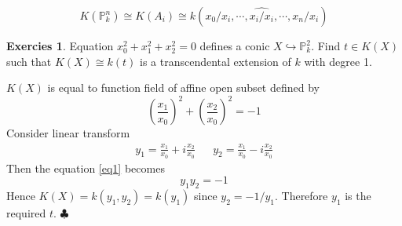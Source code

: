\documentclass[12pt,a4paper]{article}
\theoremstyle{definition}
\newtheorem{exer}{Exercies}[section]
\newcommand*{\qeds}{\hfill\ensuremath{\clubsuit}}
\begin{document}
\[
K(\mathbb{P}^n_k) \cong K(A_i) \cong k(x_0/x_i, \cdots, \widehat{x_i/x_i},\cdots, x_n/x_i)
\]
\begin{exer}
	Equation $x_0^2 + x_1^2 + x_2^2=0$ defines a conic $X \hookrightarrow \mathbb{P}_k^2$. Find $t \in K(X)$ such that $K(X) \cong k(t)$ is a transcendental extension of $k$ with degree 1.
\end{exer}
$K(X)$ is equal to function field of affine open subset defined by
\begin{equation}
\label{eq1}
	(\frac{x_1}{x_0})^2 + (\frac{x_2}{x_0})^2 = -1
\end{equation}
Consider linear transform
\begin{align}
y_1 = \frac{x_1}{x_0} + i \frac{x_2}{x_0}& &
y_2 = \frac{x_1}{x_0} - i \frac{x_2}{x_0}
\end{align}
Then the equation \ref{eq1} becomes
\begin{equation}
	y_1 y_2 =-1
\end{equation}
Hence $K(X) = k(y_1,y_2) = k(y_1)$ since $y_2 =-1/y_1$. Therefore $y_1$ is the required $t$. \qeds
\newpage
\end{document}
